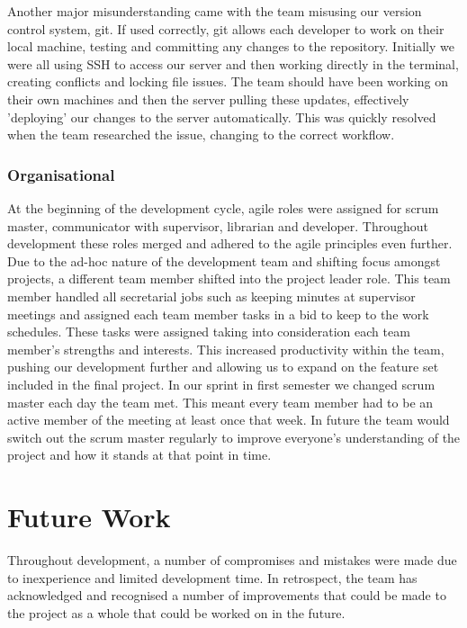 \documentclass{l3proj}
\begin{document}
Another major misunderstanding came with the team misusing our version control system, git. If used correctly, git allows each developer to work on their local machine, testing and committing any changes to the repository. Initially we were all using SSH to access our server and then working directly in the terminal, creating conflicts and locking file issues. The team should have been working on their own machines and then the server pulling these updates, effectively 'deploying' our changes to the server automatically. This was quickly resolved when the team researched the issue, changing to the correct workflow.

\subsection{Organisational}    At the beginning of the development cycle, agile roles were assigned for scrum master, communicator with supervisor, librarian and developer. Throughout development these roles merged and adhered to the agile principles even further. Due to the ad-hoc nature of the development team and shifting focus amongst projects, a different team member shifted into the project leader role. This team member handled all secretarial jobs such as keeping minutes at supervisor meetings and assigned each team member tasks in a bid to keep to the work schedules. These tasks were assigned taking into consideration each team member's strengths and interests. This increased productivity within the team, pushing our development further and allowing us to expand on the feature set included in the final project. In our sprint in first semester we changed scrum master each day the team met. This meant every team member had to be an active member of the meeting at least once that week. In future the team would switch out the scrum master regularly to improve everyone's understanding of the project and how it stands at that point in time.

\chapter{Future Work}
\label{Future Work}

Throughout development, a number of compromises and mistakes were made due to inexperience and limited development time. In retrospect, the team has acknowledged and recognised a number of improvements that could be made to the project as a whole that could be worked on in the future.
\end{document}
